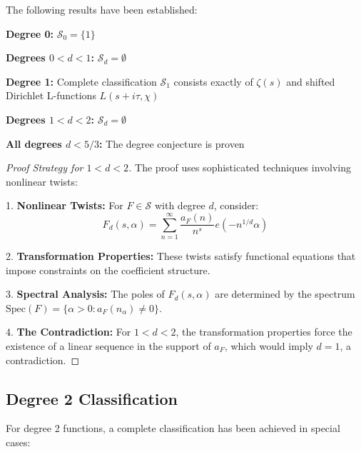 \begin{theorem}
The following results have been established:

\textbf{Degree 0:} $\mathcal{S}_0 = \{1\}$ \cite{conreyghosh1993}

\textbf{Degrees $0 < d < 1$:} $\mathcal{S}_d = \emptyset$ \cite{conreyghosh1993}

\textbf{Degree 1:} Complete classification \cite{kaczorowskiperelli1999}
$\mathcal{S}_1$ consists exactly of $\zeta(s)$ and shifted Dirichlet L-functions $L(s+i\tau, \chi)$

\textbf{Degrees $1 < d < 2$:} $\mathcal{S}_d = \emptyset$ \cite{kaczorowskiperelli2020}

\textbf{All degrees $d < 5/3$:} The degree conjecture is proven \cite{kaczorowskiperelli2020}
\end{theorem}

\begin{proof}[Proof Strategy for $1 < d < 2$]
The proof uses sophisticated techniques involving nonlinear twists:

1. \textbf{Nonlinear Twists:} For $F \in \mathcal{S}$ with degree $d$, consider:
   \begin{equation}
   F_d(s,\alpha) = \sum_{n=1}^{\infty} \frac{a_F(n)}{n^s} e(-n^{1/d}\alpha)
   \end{equation}

2. \textbf{Transformation Properties:} These twists satisfy functional equations that impose constraints on the coefficient structure.

3. \textbf{Spectral Analysis:} The poles of $F_d(s,\alpha)$ are determined by the spectrum $\text{Spec}(F) = \{\alpha > 0 : a_F(n_\alpha) \neq 0\}$.

4. \textbf{The Contradiction:} For $1 < d < 2$, the transformation properties force the existence of a linear sequence in the support of $a_F$, which would imply $d = 1$, a contradiction.
\end{proof}

\subsection{Degree 2 Classification}

For degree 2 functions, a complete classification has been achieved in special cases:

